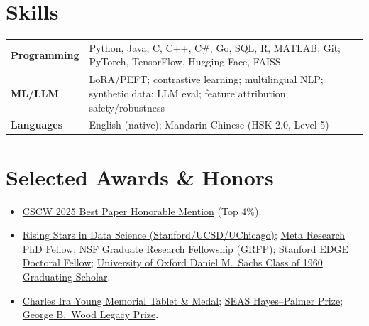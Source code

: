 \documentclass[a4,10pt]{article}
\newenvironment{zitemize}{
  \begin{itemize}\itemsep0pt\parskip0pt\parsep1pt}
  {\end{itemize}\vspace{-0.4cm}}
\newcommand{\hskills}[1]{\textbf{\bfseries #1}}
\begin{document}
\vspace{-1em}
\section{Skills}
\vspace{-0.5em}

\begin{tabular}{p{7em} p{48em}}
\hskills{Programming} & Python, Java, C, C++, C\#, Go, SQL, R, MATLAB; Git; PyTorch, TensorFlow, Hugging Face, FAISS \\[1pt]
\hskills{ML/LLM} & LoRA/PEFT; contrastive learning; multilingual NLP; synthetic data; LLM eval; feature attribution; safety/robustness \\[1pt]
\hskills{Languages} & English (native); Mandarin Chinese (HSK 2.0, Level 5) \\
\end{tabular}

\vspace{-1em}
\section{Selected Awards \& Honors}
\vspace{-0.5em}

\begin{zitemize}
\item \href{https://medium.com/acm-cscw/announcing-the-best-of-cscw-2025-a95517e67ba3}{CSCW 2025 Best Paper Honorable Mention} (Top 4\%).
\item \href{https://datascience.stanford.edu/news/shining-light-emerging-talent-rising-stars-data-science-2024-recap}{Rising Stars in Data Science (Stanford/UCSD/UChicago)};
\href{https://research.facebook.com/fellows/hanley-hans-william-alexander/}{Meta Research PhD Fellow};
\href{https://ece.princeton.edu/news/seven-current-and-former-students-awarded-nsf-graduate-research-fellowships}{NSF Graduate Research Fellowship (GRFP)};
\href{https://vpge.stanford.edu/fellowships-funding/current-vpge-fellows/all-2020}{Stanford EDGE Doctoral Fellow};
\href{https://www.princeton.edu/news/2017/12/11/princeton-seniors-hanley-and-silver-oxford-graduate-student-barnett-named-sachs}{University of Oxford Daniel M.\ Sachs Class of 1960 Graduating Scholar}.
\item \href{https://ece.princeton.edu/news/undergraduates-honored-class-day-2018}{Charles Ira Young Memorial Tablet \& Medal};
\href{https://engineering.princeton.edu/news/2018/06/05/class-day-awards-celebrate-graduates-contributions-research-and-service}{SEAS Hayes--Palmer Prize};
\href{https://www.princeton.edu/news/2016/09/11/princeton-students-honored-opening-exercises}{George B.\ Wood Legacy Prize}.
\end{zitemize}
\end{document}
